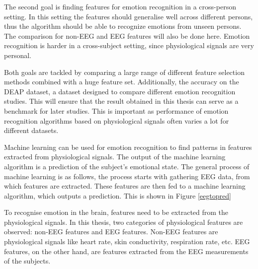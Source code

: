 \npar

The second goal is finding features for emotion recognition in a cross-person setting. In this setting the features should generalise well across different persons, thus the algorithm should be able to recognize emotions from unseen persons. The comparison for non-EEG and EEG features will also be done here. Emotion recognition is harder in a cross-subject setting, since physiological signals are very personal\citep{DEAP}.

\npar 

Both goals are tackled by comparing a large range of different feature selection methods combined with a huge feature set. Additionally, the accuracy on the DEAP dataset, a dataset designed to compare different emotion recognition studies\citep{DEAP}. This will ensure that the result obtained in this thesis can serve as a benchmark for later studies. This is important as performance of emotion recognition algorithms based on physiological signals often varies a lot for different datasets\citep{PhytoEm}.

\npar

Machine learning can be used for emotion recognition to find patterns in features extracted from physiological signals\citep{DEAP,ExtendedPaper}. The output of the machine learning algorithm is a prediction of the subject's emotional state. The general process of machine learning is as follows, the process starts with gathering EEG data, from which features are extracted. These features are then fed to a machine learning algorithm, which outputs a prediction. This is shown in Figure \ref{eegtopred}


To recognise emotion in the brain, features need to be extracted from the physiological signals. In this thesis, two categories of physiological features are observed: non-EEG features and EEG features. Non-EEG features are physiological signals like heart rate, skin conductivity, respiration rate, etc. EEG features, on the other hand, are features extracted from the EEG measurements of the subjects. 